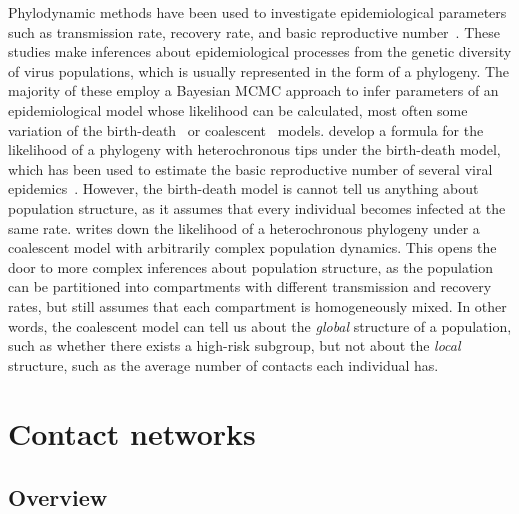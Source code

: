 Phylodynamic methods have been used to investigate epidemiological parameters
such as transmission rate, recovery rate, and basic reproductive
number~\autocite{pybus2009evolutionary, volz2013viral}. These studies make
inferences about epidemiological processes from the genetic diversity of virus
populations, which is usually represented in the form of a phylogeny. The
majority of these employ a Bayesian \gls{MCMC} approach to infer parameters of
an epidemiological model whose likelihood can be calculated, most often some
variation of the birth-death~\autocite{kendall1948generalized} or
coalescent~\autocite{kingman1982coalescent} models.
\textcite{stadler2011estimating} develop a formula for the likelihood of a
phylogeny with heterochronous tips under the birth-death model, which has been
used to estimate the basic reproductive number of several viral
epidemics~\autocite{stadler2011estimating}. However, the birth-death model is
cannot tell us anything about population structure, as it assumes that every
individual becomes infected at the same rate. \textcite{volz2012complex} writes
down the likelihood of a heterochronous phylogeny under a coalescent model with
arbitrarily complex population dynamics. This opens the door to more complex
inferences about population structure, as the population can be partitioned
into compartments with different transmission and recovery rates, but still
assumes that each compartment is homogeneously mixed. In other words, the
coalescent model can tell us about the \emph{global} structure of a population,
such as whether there exists a high-risk subgroup, but not about the
\emph{local} structure, such as the average number of contacts each individual
has. 

\section{Contact networks}
\label{sec:contactnet}

\subsection{Overview}
\label{subsec:netoverview}

